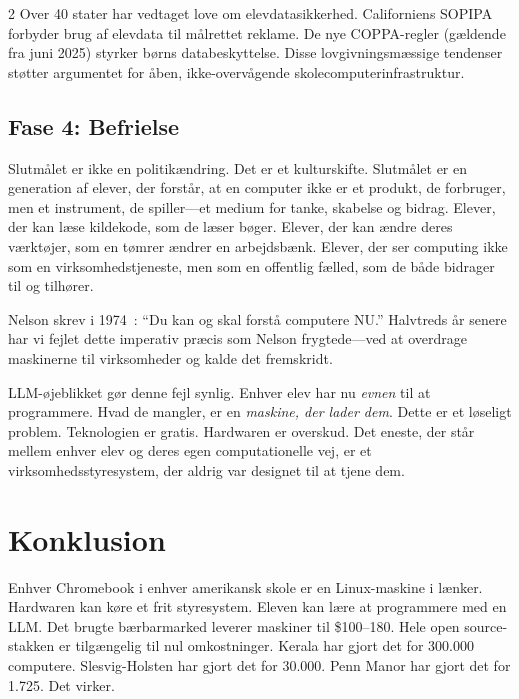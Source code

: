 \documentclass[11pt, a4paper]{article}
\begin{document}
\begin{multicols}{2}
Over 40 stater har vedtaget love om elevdatasikkerhed. Californiens SOPIPA forbyder brug af elevdata til målrettet reklame. De nye COPPA-regler (gældende fra juni 2025) styrker børns databeskyttelse. Disse lovgivningsmæssige tendenser støtter argumentet for åben, ikke-overvågende skolecomputerinfrastruktur.

\subsection{Fase 4: Befrielse}

Slutmålet er ikke en politikændring. Det er et kulturskifte. Slutmålet er en generation af elever, der forstår, at en computer ikke er et produkt, de forbruger, men et instrument, de spiller---et medium for tanke, skabelse og bidrag. Elever, der kan læse kildekode, som de læser bøger. Elever, der kan ændre deres værktøjer, som en tømrer ændrer en arbejdsbænk. Elever, der ser computing ikke som en virksomhedstjeneste, men som en offentlig fælled, som de både bidrager til og tilhører.

Nelson skrev i 1974~\citep{nelson1974computerlib}: ``Du kan og skal forstå computere NU.'' Halvtreds år senere har vi fejlet dette imperativ præcis som Nelson frygtede---ved at overdrage maskinerne til virksomheder og kalde det fremskridt.

LLM-øjeblikket gør denne fejl synlig. Enhver elev har nu \emph{evnen} til at programmere. Hvad de mangler, er en \emph{maskine, der lader dem}. Dette er et løseligt problem. Teknologien er gratis. Hardwaren er overskud. Det eneste, der står mellem enhver elev og deres egen computationelle vej, er et virksomhedsstyresystem, der aldrig var designet til at tjene dem.


\section{Konklusion}

Enhver Chromebook i enhver amerikansk skole er en Linux-maskine i lænker. Hardwaren kan køre et frit styresystem. Eleven kan lære at programmere med en LLM. Det brugte bærbarmarked leverer maskiner til \$100--180. Hele open source-stakken er tilgængelig til nul omkostninger. Kerala har gjort det for 300.000 computere. Slesvig-Holsten har gjort det for 30.000. Penn Manor har gjort det for 1.725. Det virker.


\end{multicols}
\end{document}
